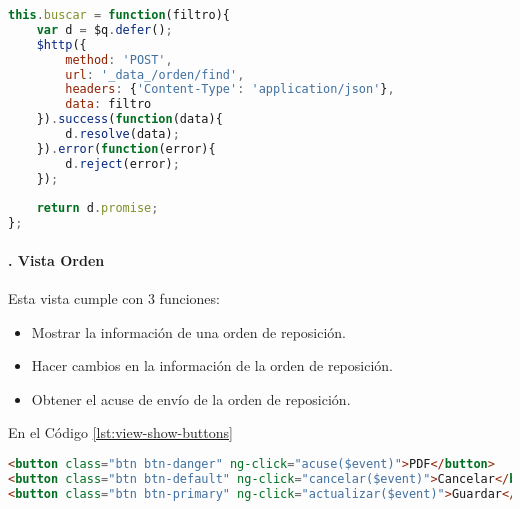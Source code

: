 \begin{lstlisting}[language=Javascript, caption={Servicio de \textit{AngularJS} para buscar órdenes de reposición.}, captionpos=b, label={lst:search-service-js}]
this.buscar = function(filtro){
	var d = $q.defer();
	$http({
		method: 'POST',
		url: '_data_/orden/find',
		headers: {'Content-Type': 'application/json'},
		data: filtro
	}).success(function(data){
		d.resolve(data);
	}).error(function(error){
		d.reject(error);
	});
	
	return d.promise;
};
\end{lstlisting}

\paragraph{. Vista Orden\\}
Esta vista cumple con 3 funciones:
\begin{itemize}
	\item Mostrar la información de una orden de reposición.
	\item Hacer cambios en la información de la orden de reposición.
	\item Obtener el acuse de envío de la orden de reposición.
\end{itemize}
En el Código \ref{lst:view-show-buttons}
\begin{lstlisting}[language=HTML, captionpos=b, caption={Controles de la vista de orden de reposición.}, label={lst:view-show-buttons}]
<button class="btn btn-danger" ng-click="acuse($event)">PDF</button>
<button class="btn btn-default" ng-click="cancelar($event)">Cancelar</button>
<button class="btn btn-primary" ng-click="actualizar($event)">Guardar</button>
\end{lstlisting}

